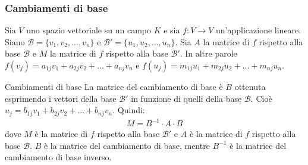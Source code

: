 \documentclass[a4paper]{article}
\theoremstyle{definition}
\newtheorem*{es}{Esempio}
\begin{document}
\subsubsection{Cambiamenti di base}
Sia $V$ uno spazio vettoriale su un campo $K$ e sia $f: V \rightarrow V$ un'applicazione lineare.
Siano $\mathcal{B} = \{v_1, v_2, ..., v_n\}$ e $\mathcal{B}' = \{u_1, u_2, ..., u_n\}$.
Sia $A$ la matrice di $f$ rispetto alla base $\mathcal{B}$ e $M$ la matrice di $f$ rispetto alla base $\mathcal{B}'$.
In altre parole $f(v_j) = a_{1j}v_1 + a_{2j}v_2 + ... + a_{nj}v_n$ e $f(u_j) = m_{1j}u_1 + m_{2j}u_2 + ... + m_{nj}u_n$.
\begin{teo}{Cambiamenti di base}{}
	La matrice del cambiamento di base è $B$ ottenuta esprimendo i vettori della base $\mathcal{B}'$ in funzione di quelli della base $\mathcal{B}$.
	Cioè $u_j = b_{1j}v_1 + b_{2j}v_2 + ... + b_{nj}v_n$.
	Quindi:
	\begin{align*}
		M = B^{-1} \cdot A \cdot B
	\end{align*}
	dove $M$ è la matrice di $f$ rispetto alla base $\mathcal{B}'$ e $A$ è la matrice di $f$ rispetto alla base $\mathcal{B}$.
	$B$ è la matrice del cambiamento di base, mentre $B^{-1}$ è la matrice del cambiamento di base inverso.
\end{teo}
\end{document}
